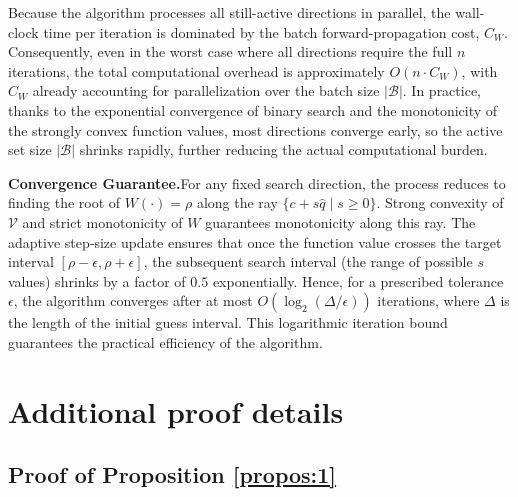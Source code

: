 \documentclass[journal]{IEEEtran}
\begin{document}
{Because the algorithm processes all still-active directions in parallel, the wall-clock time per iteration is dominated by the batch forward-propagation cost, $C_W$. Consequently, even in the worst case where all directions require the full $n$ iterations, the total computational overhead is approximately $O(n \cdot C_W)$, with $C_W$ already accounting for parallelization over the batch size $|\mathcal{B}|$. In practice, thanks to the exponential convergence of binary search and the monotonicity of the strongly convex function values, most directions converge early, so the active set size $|\mathcal{B}|$ shrinks rapidly, further reducing the actual computational burden.

\noindent \textbf{Convergence Guarantee.}\quad For any fixed search direction, the process reduces to finding the root of $W(\cdot) = \rho$ along the ray $\{c + s \hat{q} \mid s \ge 0\}$. Strong convexity of $\mathcal{V}$ and strict monotonicity of $W$  guarantees monotonicity along this ray. The adaptive step‑size update ensures that once the function value crosses the target interval $[\rho-\epsilon, \rho+\epsilon]$, the subsequent search interval (the range of possible $s$ values) shrinks by a factor of $0.5$ exponentially. Hence, for a prescribed tolerance $\epsilon$, the algorithm converges after at most $O(\log_2(\Delta / \epsilon))$ iterations, where $\Delta$ is the length of the initial guess interval. This logarithmic iteration bound guarantees the practical efficiency of the algorithm.

\section{Additional proof details}

\subsection{Proof of Proposition \ref{propos:1} }
\label{app:pro1}


}
\end{document}
